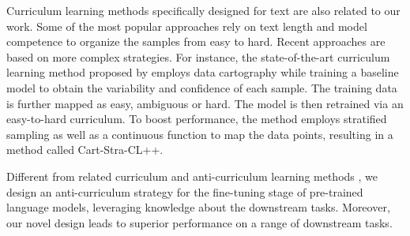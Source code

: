 Curriculum learning methods specifically designed for text \cite{Gong-CIKM-2021,Kocmi-RANLP-2017,Liu-IJCAI-2018,Liu-ACL-2020,Zhan-AAAI-2021} are also related to our work. Some of the most popular approaches rely on text length \cite{Nagatsuka-NGC-2023} and model competence \cite{Platanios-NAACL-2019} to organize the samples from easy to hard. Recent approaches are based on more complex strategies. For instance, the state-of-the-art curriculum learning method proposed by \citet{Poesina-ACL-2024} employs data cartography \cite{Swayamdipta-EMNLP-2020} while training a baseline model to obtain the variability and confidence of each sample. The training data is further mapped as easy, ambiguous or hard. The model is then retrained via an easy-to-hard curriculum. To boost performance, the method employs stratified sampling as well as a continuous function to map the data points, resulting in a method called Cart-Stra-CL++.

Different from related curriculum and anti-curriculum learning methods \cite{Ankner-EACL-2024,Poesina-ACL-2024,Yang-ACL-2023}, we design an anti-curriculum strategy for the fine-tuning stage of pre-trained language models, leveraging knowledge about the downstream tasks. Moreover, our novel design leads to superior performance on a range of downstream tasks.
%